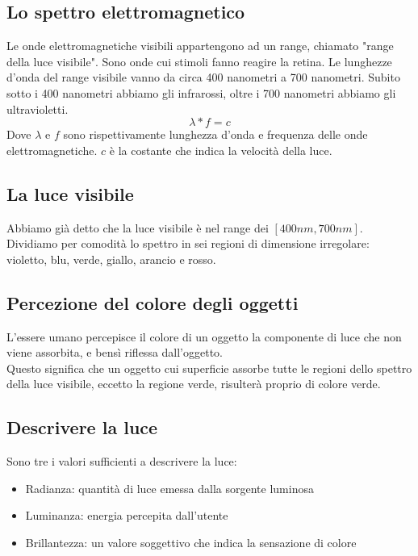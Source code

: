 \documentclass{report}
\begin{document}
	\subsection{Lo spettro elettromagnetico}
	Le onde elettromagnetiche visibili appartengono ad un range, chiamato "range della luce visibile". Sono onde cui stimoli fanno reagire la retina.
	Le lunghezze d'onda del range visibile vanno da circa 400 nanometri a 700 nanometri. Subito sotto i 400 nanometri abbiamo gli infrarossi, oltre i 700 nanometri abbiamo gli ultravioletti.
	$$
	\lambda * f = c
	$$
	Dove $\lambda$ e $f$ sono rispettivamente lunghezza d'onda e frequenza delle onde elettromagnetiche. $c$ è la costante che indica la velocità della luce.
	\subsection{La luce visibile}
	Abbiamo già detto che la luce visibile è nel range dei $[400nm,700nm]$.
	Dividiamo per comodità lo spettro in sei regioni di dimensione irregolare: violetto, blu, verde, giallo, arancio e rosso.
	\subsection{Percezione del colore degli oggetti}
	L'essere umano percepisce il colore di un oggetto la componente di luce che non viene assorbita, e bensì riflessa dall'oggetto.\\
	Questo significa che un oggetto cui superficie assorbe tutte le regioni dello spettro della luce visibile, eccetto la regione verde, risulterà proprio di colore verde.
	\subsection{Descrivere la luce}
	Sono tre i valori sufficienti a descrivere la luce:
	\begin{itemize}
		\item Radianza: quantità di luce emessa dalla sorgente luminosa
		\item Luminanza: energia percepita dall'utente
		\item Brillantezza: un valore soggettivo che indica la sensazione di colore
	\end{itemize}
		
\end{document}
